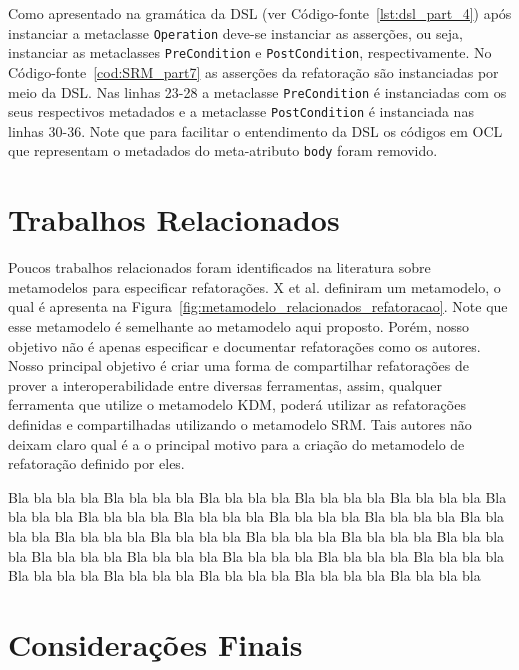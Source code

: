 Como apresentado na gramática da DSL (ver Código-fonte~\ref{lst:dsl_part_4}) após instanciar a metaclasse \texttt{Operation} deve-se instanciar as asserções, ou seja, instanciar as metaclasses \texttt{PreCondition} e \texttt{PostCondition}, respectivamente. No Código-fonte~\ref{cod:SRM_part7} as asserções da refatoração são instanciadas por meio da DSL. Nas linhas 23-28 a metaclasse \texttt{PreCondition} é instanciadas com os seus respectivos metadados e a metaclasse \texttt{PostCondition} é instanciada nas linhas 30-36. Note que para facilitar o entendimento da DSL os códigos em OCL que representam o metadados do meta-atributo \texttt{body} foram removido. 


\section{Trabalhos Relacionados}\label{sec:trabalhos_relacionais_SRM}

Poucos trabalhos relacionados foram identificados na literatura sobre metamodelos para especificar refatorações. X et al. definiram um metamodelo, o qual é apresenta na Figura~\ref{fig:metamodelo_relacionados_refatoracao}. Note que esse metamodelo é semelhante ao metamodelo aqui proposto. Porém, nosso objetivo não é apenas especificar e documentar refatorações como os autores. Nosso principal objetivo é criar uma forma de compartilhar refatorações de prover a interoperabilidade entre diversas ferramentas, assim, qualquer ferramenta que utilize o metamodelo KDM, poderá utilizar as refatorações definidas e compartilhadas utilizando o metamodelo SRM. Tais autores não deixam claro qual é a o principal motivo para a criação do metamodelo de refatoração definido por eles.


Bla bla bla bla Bla bla bla bla Bla bla bla bla Bla bla bla bla Bla bla bla bla Bla bla bla bla Bla bla bla bla Bla bla bla bla Bla bla bla bla Bla bla bla bla Bla bla bla bla Bla bla bla bla Bla bla bla bla Bla bla bla bla Bla bla bla bla Bla bla bla bla Bla bla bla bla Bla bla bla bla Bla bla bla bla Bla bla bla bla Bla bla bla bla Bla bla bla bla Bla bla bla bla Bla bla bla bla Bla bla bla bla Bla bla bla bla 

\section{Considerações Finais}
\label{sec:consideracoes_finais_SRM}

